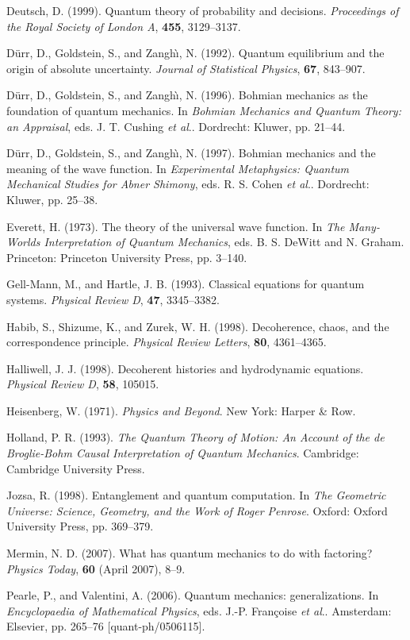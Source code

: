 \documentclass[12pt]{article}%
\begin{document}
Deutsch, D. (1999). Quantum theory of probability and decisions.
\textit{Proceedings of the Royal Society of London A}, \textbf{455}, 3129--3137.

D\"{u}rr, D., Goldstein, S., and Zangh\`{\i}, N. (1992). Quantum equilibrium
and the origin of absolute uncertainty. \textit{Journal of Statistical
Physics}, \textbf{67}, 843--907.

D\"{u}rr, D., Goldstein, S., and Zangh\`{\i}, N. (1996). Bohmian mechanics as
the foundation of quantum mechanics. In \textit{Bohmian Mechanics and Quantum
Theory: an Appraisal}, eds. J. T. Cushing \textit{et al}.. Dordrecht: Kluwer,
pp. 21--44.

D\"{u}rr, D., Goldstein, S., and Zangh\`{\i}, N. (1997). Bohmian mechanics and
the meaning of the wave function. In \textit{Experimental Metaphysics: Quantum
Mechanical Studies for Abner Shimony}, eds. R. S. Cohen \textit{et al}..
Dordrecht: Kluwer, pp. 25--38.

Everett, H. (1973). The theory of the universal wave function. In \textit{The
Many-Worlds Interpretation of Quantum Mechanics}, eds. B. S. DeWitt and N.
Graham. Princeton: Princeton University Press, pp. 3--140.

Gell-Mann, M., and Hartle, J. B. (1993). Classical equations for quantum
systems. \textit{Physical Review D}, \textbf{47}, 3345--3382.

Habib, S., Shizume, K., and Zurek, W. H. (1998). Decoherence, chaos, and the
correspondence principle. \textit{Physical Review Letters}, \textbf{80}, 4361--4365.

Halliwell, J. J. (1998). Decoherent histories and hydrodynamic equations.
\textit{Physical Review D}, \textbf{58}, 105015.

Heisenberg, W. (1971). \textit{Physics and Beyond}. New York: Harper {\&} Row.

Holland, P. R. (1993). \textit{The Quantum Theory of Motion: An Account of the
de Broglie-Bohm Causal Interpretation of Quantum Mechanics}. Cambridge:
Cambridge University Press.

Jozsa, R. (1998). Entanglement and quantum computation. In \textit{The
Geometric Universe: Science, Geometry, and the Work of Roger Penrose}. Oxford:
Oxford University Press, pp. 369--379.

Mermin, N. D. (2007). What has quantum mechanics to do with factoring?
\textit{Physics Today}, \textbf{60} (April 2007), 8--9.

Pearle, P., and Valentini, A. (2006). Quantum mechanics: generalizations. In
\textit{Encyclopaedia of Mathematical Physics}, eds. J.-P. Fran\c{c}oise
\textit{et al}.. Amsterdam: Elsevier, pp. 265--76 [quant-ph/0506115].
\end{document}
